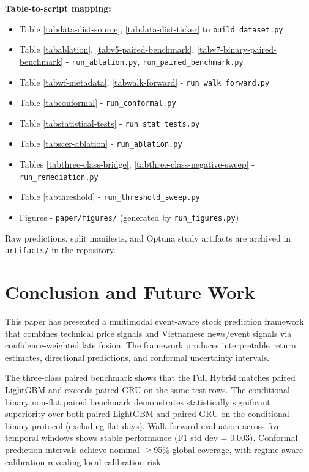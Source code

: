 \documentclass[runningheads]{llncs}
\begin{document}
\textbf{Table-to-script mapping:}
\begin{itemize}
\item Table \ref{tabdata-dist-source}, \ref{tabdata-dist-ticker} to \texttt{build\_dataset.py}
\item Table \ref{tabablation}, \ref{tabv5-paired-benchmark}, \ref{tabv7-binary-paired-benchmark} - \texttt{run\_ablation.py}, \texttt{run\_paired\_benchmark.py}
\item Table \ref{tabwf-metadata}, \ref{tabwalk-forward} - \texttt{run\_walk\_forward.py}
\item Table \ref{tabconformal} - \texttt{run\_conformal.py}
\item Table \ref{tabstatistical-tests} - \texttt{run\_stat\_tests.py}
\item Table \ref{tabscer-ablation} - \texttt{run\_ablation.py}
\item Tables \ref{tabthree-class-bridge}, \ref{tabthree-class-negative-sweep} - \texttt{run\_remediation.py}
\item Table \ref{tabthreshold} - \texttt{run\_threshold\_sweep.py}
\item Figures - \texttt{paper/figures/} (generated by \texttt{run\_figures.py})
\end{itemize}

Raw predictions, split manifests, and Optuna study artifacts are archived in \texttt{artifacts/} in the repository.

\section{Conclusion and Future Work}
\label{secconclusion}

This paper has presented a multimodal event-aware stock prediction framework that combines technical price signals and Vietnamese news/event signals via confidence-weighted late fusion. The framework produces interpretable return estimates, directional predictions, and conformal uncertainty intervals.

The three-class paired benchmark shows that the Full Hybrid matches paired LightGBM and exceeds paired GRU on the same test rows. The conditional binary non-flat paired benchmark demonstrates statistically significant superiority over both paired LightGBM and paired GRU on the conditional binary protocol (excluding flat days). Walk-forward evaluation across five temporal windows shows stable performance (F1 std dev = 0.003). Conformal prediction intervals achieve nominal $\ge$95\% global coverage, with regime-aware calibration revealing local calibration risk.
\end{document}
